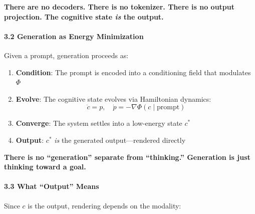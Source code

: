 \documentclass[
  11pt,
  a4paper,
]{article}
\providecommand{\tightlist}{%
  \setlength{\itemsep}{0pt}\setlength{\parskip}{0pt}}
\begin{document}
\textbf{There are no decoders. There is no tokenizer. There is no output
projection. The cognitive state \emph{is} the output.}

\paragraph{3.2 Generation as Energy
Minimization}\label{generation-as-energy-minimization}

Given a prompt, generation proceeds as:

\begin{enumerate}
\def\labelenumi{\arabic{enumi}.}
\tightlist
\item
  \textbf{Condition}: The prompt is encoded into a conditioning field
  that modulates \(\Phi\)
\item
  \textbf{Evolve}: The cognitive state evolves via Hamiltonian dynamics:
  \[
  \dot{c} = p, \quad \dot{p} = -\nabla\Phi(c \mid \text{prompt})
  \]
\item
  \textbf{Converge}: The system settles into a low-energy state \(c^*\)
\item
  \textbf{Output}: \(c^*\) \emph{is} the generated output---rendered
  directly
\end{enumerate}

\textbf{There is no ``generation'' separate from ``thinking.''
Generation is just thinking toward a goal.}

\paragraph{3.3 What ``Output'' Means}\label{what-output-means}

Since \(c\) is the output, rendering depends on the modality:
\end{document}
